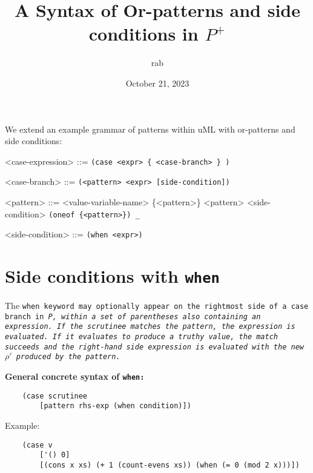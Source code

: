 \documentclass[]{article}
\title{A Syntax of Or-patterns and side conditions in $P^{+}$}
\author{rab}
\date{October 21, 2023}
\begin{document}
\maketitle


We extend an example grammar of patterns within uML with 
or-patterns and side conditions: 

\bigskip

\begin{grammar}
    <case-expression> ::= \tt{(case} <expr> \{ <case-branch> \} \tt{)}
    
    <case-branch> ::= \tt{(}<pattern> <expr> [side-condition]\tt{)}
    
    <pattern> ::= <value-variable-name>
     \{<pattern>\}
    \alt <pattern> <side-condition> 
    \alt \tt{(oneof} \{<pattern>\}\tt{)}
    \alt \tt{_}
    
    <side-condition> ::= \tt{(when} <expr>\tt{)}
\end{grammar}

\bigskip

\section{Side conditions with \tt{when}}

The \tt{when} keyword may optionally appear on the rightmost side of a \tt{case}
branch in \it{P}, within a set of parentheses also containing an expression.
If the scrutinee matches the pattern, the expression is evaluated. If it 
evaluates to produce a truthy value, the match succeeds and the right-hand
side expression is evaluated with the new $\rho'$ produced by the pattern.

\medskip

\bf{General concrete syntax of \tt{when}: }

\begin{verbatim}
    (case scrutinee
        [pattern rhs-exp (when condition)])
\end{verbatim}


Example: 
\begin{verbatim}
    (case v
        ['() 0]
        [(cons x xs) (+ 1 (count-evens xs)) (when (= 0 (mod 2 x)))])
\end{verbatim}


\end{document}
